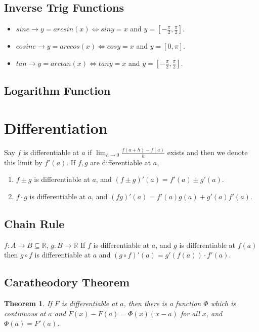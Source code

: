 \documentclass[11pt]{article}
\newcommand{\R}{{\mathbb R}}
\newtheorem {thm}{Theorem}
\begin{document}
\subsection{Inverse Trig Functions}
\begin{itemize}
	\item $sine \to y = arcsin(x) \Leftrightarrow siny = x$ and $y = \left[ -\frac{\pi}{2}, \frac{\pi}{2}\right]$.
	\item $cosine \to y = arccos(x) \Leftrightarrow cosy = x$ and $y = \left[ 0, \pi \right]$.
	\item $tan \to y = arctan(x) \Leftrightarrow tany = x$ and $y = \left[ -\frac{\pi}{2}, \frac{\pi}{2}\right]$.
\end{itemize}

\subsection{Logarithm Function}

\newpage
\section{Differentiation}
Say $f$ is differentiable at $a$ if $\lim_{h \to 0} \frac{f(a+h) - f(a)}{h}$ exists and then we denote this limit by $f'(a)$.
If $f,g$ are differentiable at $a$,
\begin{enumerate}
	\item $f \pm g$ is differentiable at $a$, and $(f \pm g)'(a) = f'(a) \pm g'(a)$.
	\item $f \cdot g$ is differentiable at $a$, and $(fg)'(a) = f'(a)g(a) + g'(a)f'(a)$.
\end{enumerate}
\subsection{Chain Rule}
$f: A \to B \subseteq \R$, $g: B \to \R$
If $f$ is differentiable at $a$, and $g$ is differentiable at $f(a)$ then $g \circ f$ is differentiable at $a$ and $(g \circ f)'(a) = g'(f(a)) \cdot f'(a)$.

\subsection{Caratheodory Theorem}
\begin{thm}
If $F$ is differentiable at $a$, then there is a function $\Phi$ which is continuous at $a$ and $F(x) - F(a) = \Phi(x)(x - a)$
for all $x$, and $\Phi(a) = F'(a)$.
\end{thm}
\end{document}
